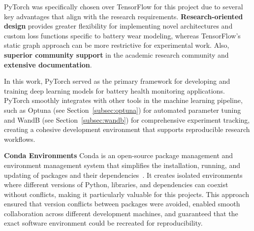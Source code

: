 PyTorch was specifically chosen over TensorFlow for this project due to several key advantages that align with the research requirements. \textbf{Research-oriented design} provides greater flexibility for implementing novel architectures and custom loss functions specific to battery wear modeling, whereas TensorFlow's static graph approach can be more restrictive for experimental work. Also, \textbf{superior community support} in the academic research community and \textbf{extensive documentation}.

In this work, PyTorch served as the primary framework for developing and training deep learning models for battery health monitoring applications. PyTorch smoothly integrates with other tools in the machine learning pipeline, such as Optuna (see Section~\ref{subsec:optuna}) for automated parameter tuning and WandB (see Section~\ref{subsec:wandb}) for comprehensive experiment tracking, creating a cohesive development environment that supports reproducible research workflows.

\textbf{Conda Environments}
Conda is an open-source package management and environment management system that simplifies the installation, running, and updating of packages and 
their dependencies~\cite{conda_contributors_conda_2025}. It creates isolated environments where different versions of Python, libraries, 
and dependencies can coexist without conflicts, making it particularly valuable for this projects. This approach ensured that version conflicts between packages were avoided, enabled smooth collaboration across different 
development machines, and guaranteed that the exact software environment could be recreated for reproducibility.

